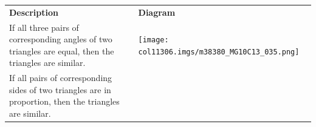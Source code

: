 \begin{table}[H]
\begin{center}
\begin{xtabular*}{\mytablewidth}[t]{|p{10\mystarwidth}|p{10\mystarwidth}|}
                    \textbf{Description}
                   &
    
    
        
                    \textbf{Diagram}
     \tabularnewline{}
    
    
        If all three pairs of corresponding angles of two triangles are equal,
then the triangles are similar. &
    
    
        
                    
    \setcounter{subfigure}{0}

\label{m38380*id318251}
    \begin{center}
   
\label{m38380*id318251!!!underscore!!!media}\label{
m38380*id318251!!!underscore!!!printimage}\texttt{[image: col11306.imgs/m38380\_MG10C13\_035.png]} %
        
      \vspace{2pt}
    \vspace{.1in}
    
    \end{center}



    \addtocounter{footnote}{-0}
    
     \tabularnewline{}
    
    
        If all pairs of corresponding sides of two triangles are in proportion,
then the triangles are similar. &
    

\end{xtabular*}
\end{center}
\end{table}
